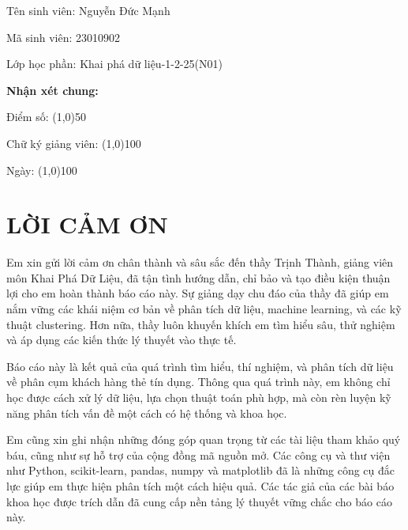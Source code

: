\documentclass[12pt, a4paper, twoside]{report}
\begin{document}
\noindent Tên sinh viên: \hfill Nguyễn Đức Mạnh

\vspace{0.8cm}
\noindent Mã sinh viên: \hfill 23010902

\vspace{0.8cm}
\noindent Lớp học phần: \hfill Khai phá dữ liệu-1-2-25(N01)

\vspace{2cm}

\noindent \textbf{Nhận xét chung:}
\vspace{5.5cm}

\noindent Điểm số: \hfill \line(1,0){50}

\vspace{0.8cm}
\noindent Chữ ký giảng viên: \hfill \line(1,0){100}

\vspace{0.8cm}
\noindent Ngày: \hfill \line(1,0){100}

\newpage

\tableofcontents
\newpage

\chapter*{LỜI CẢM ƠN}

Em xin gửi lời cảm ơn chân thành và sâu sắc đến thầy Trịnh Thành, giảng viên môn Khai Phá Dữ Liệu, đã tận tình hướng dẫn, chỉ bảo và tạo điều kiện thuận lợi cho em hoàn thành báo cáo này. Sự giảng dạy chu đáo của thầy đã giúp em nắm vững các khái niệm cơ bản về phân tích dữ liệu, machine learning, và các kỹ thuật clustering. Hơn nữa, thầy luôn khuyến khích em tìm hiểu sâu, thử nghiệm và áp dụng các kiến thức lý thuyết vào thực tế.

Báo cáo này là kết quả của quá trình tìm hiểu, thí nghiệm, và phân tích dữ liệu về phân cụm khách hàng thẻ tín dụng. Thông qua quá trình này, em không chỉ học được cách xử lý dữ liệu, lựa chọn thuật toán phù hợp, mà còn rèn luyện kỹ năng phân tích vấn đề một cách có hệ thống và khoa học.

Em cũng xin ghi nhận những đóng góp quan trọng từ các tài liệu tham khảo quý báu, cũng như sự hỗ trợ của cộng đồng mã nguồn mở. Các công cụ và thư viện như Python, scikit-learn, pandas, numpy và matplotlib đã là những công cụ đắc lực giúp em thực hiện phân tích một cách hiệu quả. Các tác giả của các bài báo khoa học được trích dẫn đã cung cấp nền tảng lý thuyết vững chắc cho báo cáo này.
\end{document}
